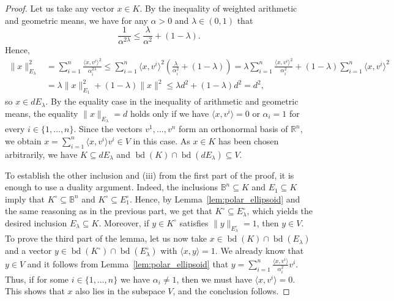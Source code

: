 \documentclass[12pt,a4paper]{article}
\theoremstyle{definition}
\DeclareMathOperator{\bd}{bd}
\newcommand\R{\mathbb{R}}
\newcommand\B{\mathbb{B}}
\begin{document}
\begin{proof} Let us take any vector $x \in K$. By the inequality of weighted arithmetic and geometric means, we have for any $\alpha > 0$ and $\lambda \in (0, 1)$ that
$$ \frac{1}{\alpha^{2 \lambda}} \leq \frac{\lambda}{\alpha^2} + (1-\lambda). $$
Hence,
\begin{align*}
\|x\|_{E_\lambda}^2
& = \sum_{i=1}^n \frac{\langle x, v^i \rangle^2}{\alpha_i^{2 \lambda}}
\leq \sum_{i=1}^n \langle x, v^i \rangle^2 \left( \frac{\lambda}{\alpha_i^2} + (1-\lambda) \right)
= \lambda \sum_{i=1}^n \frac{\langle x, v^i \rangle^2 }{\alpha_i^2} + (1-\lambda) \sum_{i=1}^n \langle x, v^i \rangle^2  \\
& =\lambda \|x\|_{E_1}^2 + (1-\lambda) \|x\|^2
\leq \lambda d^2 + (1-\lambda) d^2
= d^2,
\end{align*}
so $x \in d E_\lambda$. By the equality case in the inequality of arithmetic and geometric means, the equality $\|x\|_{E_\lambda} = d$ holds only if we have $\langle x, v^i \rangle  = 0$ or $\alpha_i = 1$ for every $i \in \{1, \ldots, n\}$. Since the vectors $v^1, \ldots, v^n$ form an orthonormal basis of $\R^n$, we obtain $x = \sum_{i=1}^n \langle x, v^i \rangle v^i \in V$ in this case. As $x \in K$ has been chosen arbitrarily, we have $K \subseteq d E_\lambda$ and $\bd(K) \cap \bd(d E_\lambda) \subseteq V$.

To establish the other inclusion and (iii) from the first part of the proof, it is enough to use a duality argument. Indeed, the inclusions $\B^n \subseteq K$ and $E_1 \subseteq K$ imply that $K^{\circ} \subseteq \B^n$ and $K^{\circ} \subseteq E_1^{\circ}$. Hence, by Lemma~\ref{lem:polar_ellipsoid} and the same reasoning as in the previous part, we get that $K^{\circ} \subseteq E_{\lambda}^{\circ}$, which yields the desired inclusion $E_{\lambda} \subseteq K$. Moreover, if $y \in K^{\circ}$ satisfies $\|y\|_{E_{\lambda}^{\circ}}=1$, then $y \in V$. To prove the third part of the lemma, let us now take $x \in \bd(K) \cap \bd(E_\lambda)$ and a vector $y \in \bd(K^{\circ}) \cap \bd(E^{\circ}_\lambda)$ with $\langle x, y \rangle = 1$. We already know that $y \in V$ and it follows from Lemma~\ref{lem:polar_ellipsoid} that $y = \sum_{i=1}^n \frac{\langle x, v^i \rangle }{\alpha_i^2} v^i$. Thus, if for some $i \in \{1, \ldots, n\}$ we have $\alpha_i \neq 1$, then we must have $\langle x, v^i \rangle = 0$. This shows that $x$ also lies in the subspace $V$, and the conclusion follows.
\end{proof}
\end{document}
